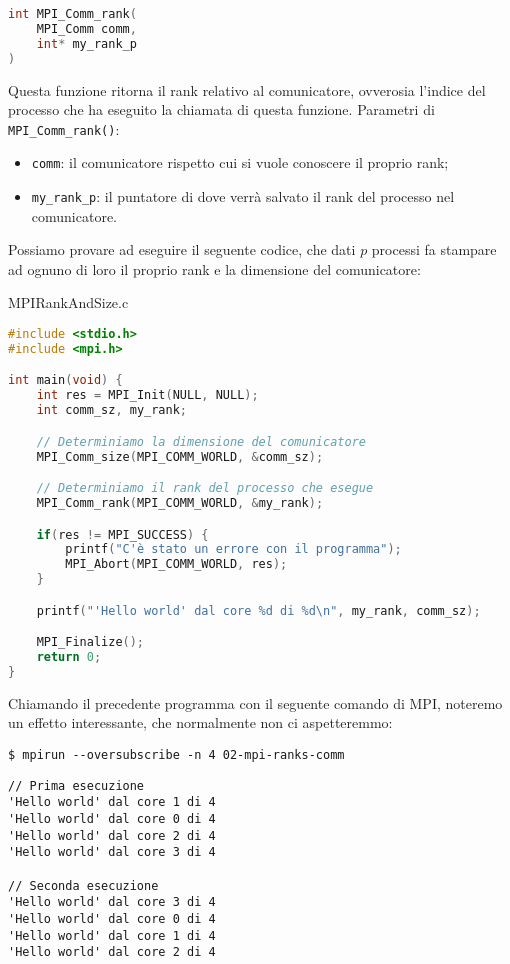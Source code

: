 \begin{codedefine}
    \begin{lstlisting}[language = C, numbers = none]
int MPI_Comm_rank(
    MPI_Comm comm,
    int* my_rank_p
)\end{lstlisting}
    \manlower
    Questa funzione ritorna il rank relativo al comunicatore, ovverosia l'indice del processo che ha eseguito la chiamata di questa funzione.
    \nwl
    Parametri di \verb|MPI_Comm_rank()|:
    \begin{itemize}
        \item \verb|comm|: il comunicatore rispetto cui si vuole conoscere il proprio rank;
        \item \verb|my_rank_p|: il puntatore di dove verrà salvato il rank del processo nel comunicatore.
    \end{itemize}
\end{codedefine}

Possiamo provare ad eseguire il seguente codice, che dati $p$ processi fa stampare ad ognuno di loro il proprio rank e la dimensione del comunicatore:

\begin{codeblock}{MPIRankAndSize.c}
    \begin{lstlisting}[language = C]
#include <stdio.h>
#include <mpi.h>

int main(void) {
    int res = MPI_Init(NULL, NULL);
    int comm_sz, my_rank;

    // Determiniamo la dimensione del comunicatore
    MPI_Comm_size(MPI_COMM_WORLD, &comm_sz);

    // Determiniamo il rank del processo che esegue
    MPI_Comm_rank(MPI_COMM_WORLD, &my_rank);

    if(res != MPI_SUCCESS) {
        printf("C'è stato un errore con il programma");
        MPI_Abort(MPI_COMM_WORLD, res);
    }

    printf("'Hello world' dal core %d di %d\n", my_rank, comm_sz);

    MPI_Finalize();
    return 0;
}\end{lstlisting}
\end{codeblock}

Chiamando il precedente programma con il seguente comando di MPI, noteremo un effetto interessante, che normalmente non ci aspetteremmo:

\begin{terminal}
    \begin{lstlisting}[style = notexterm]
 $ mpirun --oversubscribe -n 4 02-mpi-ranks-comm
    \end{lstlisting}
    \begin{tcolorbox}
        \begin{lstlisting}[basewidth=0.44em, numbers=none]
// Prima esecuzione
'Hello world' dal core 1 di 4
'Hello world' dal core 0 di 4
'Hello world' dal core 2 di 4
'Hello world' dal core 3 di 4

// Seconda esecuzione
'Hello world' dal core 3 di 4
'Hello world' dal core 0 di 4
'Hello world' dal core 1 di 4
'Hello world' dal core 2 di 4\end{lstlisting}
    \end{tcolorbox}
\end{terminal}

